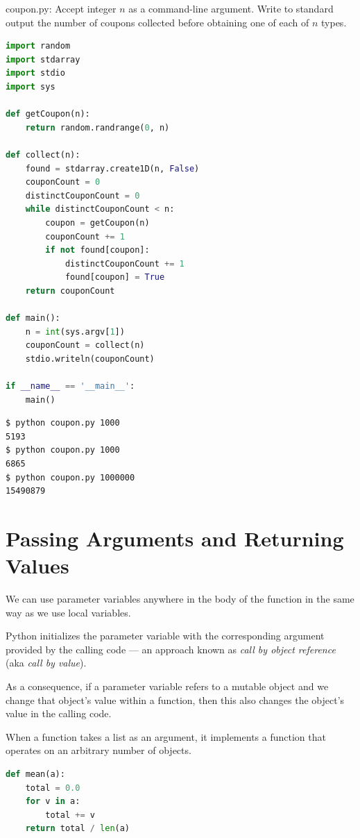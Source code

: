 \documentclass[8pt,a4paper,compress,handout]{beamer}
\begin{document}
\begin{frame}[fragile]
\begin{framed}
\tiny coupon.py: Accept integer $n$ as a command-line argument. Write to standard output the number of coupons collected before obtaining one of each of $n$ types.
\end{framed}

\begin{lstlisting}[language=Python]
import random
import stdarray
import stdio
import sys

def getCoupon(n):
    return random.randrange(0, n)

def collect(n):
    found = stdarray.create1D(n, False)
    couponCount = 0
    distinctCouponCount = 0
    while distinctCouponCount < n:
        coupon = getCoupon(n)
        couponCount += 1
        if not found[coupon]:
            distinctCouponCount += 1
            found[coupon] = True
    return couponCount

def main():
    n = int(sys.argv[1])
    couponCount = collect(n)
    stdio.writeln(couponCount)

if __name__ == '__main__':
    main()
\end{lstlisting}
\end{frame}

\begin{frame}[fragile]
\begin{lstlisting}[language={}]
$ python coupon.py 1000
5193
$ python coupon.py 1000
6865
$ python coupon.py 1000000
15490879
\end{lstlisting}
\end{frame}

\section{Passing Arguments and Returning Values}
\begin{frame}[fragile]
We can use parameter variables anywhere in the body of the function in the same way as we use local variables. 

\bigskip

Python initializes the parameter variable with the corresponding argument provided by the calling code --- an approach known as \emph{call by object reference} (aka \emph{call by value}).

\bigskip

As a consequence, if a parameter variable refers to a mutable object and we change that object's value within a function, then this also changes the object's value in the calling code.

\bigskip

When a function takes a list as an argument, it implements a function that operates on an arbitrary number of objects. 
\begin{lstlisting}[language=Python]
def mean(a):
    total = 0.0
    for v in a:
        total += v
    return total / len(a)
\end{lstlisting}
\end{frame}
\end{document}
